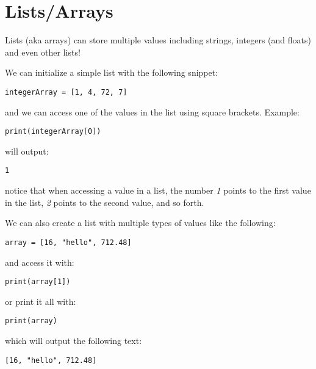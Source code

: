\section*{Lists/Arrays}
Lists (aka arrays) can store multiple values including strings, integers (and floats) and even other lists!

We can initialize a simple list with the following snippet:
\begin{lstlisting}
integerArray = [1, 4, 72, 7]
\end{lstlisting}
and we can access one of the values in the list using square brackets.
Example:
\begin{lstlisting}
print(integerArray[0])
\end{lstlisting}
will output:
\begin{lstlisting}[language=Text]
1
\end{lstlisting}
notice that when accessing a value in a list, the number \emph{1} points to the first value in the list,
\emph{2} points to the second value, and so forth.


We can also create a list with multiple types of values like the following:
\begin{lstlisting}
array = [16, "hello", 712.48]
\end{lstlisting}
and access it with:
\begin{lstlisting}
print(array[1])
\end{lstlisting}
or print it all with:
\begin{lstlisting}
print(array)
\end{lstlisting}
which will output the following text:
\begin{lstlisting}[language=Text]
[16, "hello", 712.48]
\end{lstlisting}



